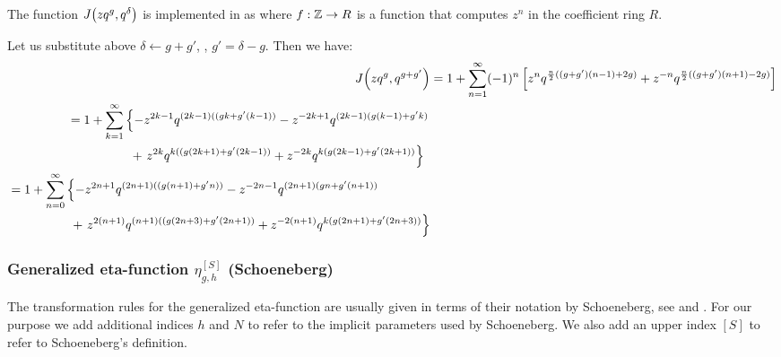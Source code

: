 \documentclass{article}
\begin{document}
The function $J\!\left(z q^g,q^\delta\right)$ is implemented in
 as  where
$f: \mathbb{Z} \to R$ is a function that computes $z^n$ in the coefficient
ring $R$.

Let us substitute above $\delta \gets g + g'$, \ie, $g'=\delta-g$.
Then we have:
\begin{align}
  J\!\left(zq^g,q^{g+g'}\right)
   &=
    1 + \sum_{n=1}^\infty (-1)^n \left[
    z^n q^{\frac{n}{2}((g+g') (n-1) + 2 g)}
    +
    z^{-n} q^{\frac{n}{2}((g+g') (n+1) - 2 g)}
    \right]
  \notag\\
  \begin{split}
  &=
    1 + \sum_{k=1}^\infty
    \left\{
    -
    z^{2k-1}
    q^{(2k-1)((g k + g' (k-1))}
    -
    z^{-2k+1}
    q^{(2k-1)(g (k-1) + g' k)}
    \right.
  \notag\\
  &\qquad\qquad\quad
    +
    \left.
    z^{2k}
    q^{k ((g (2k+1) + g' (2k-1))}
    +
    z^{-2k}
    q^{k (g (2k-1) +g' (2k+1))}
  \right\}
  \end{split}
  \notag\\
  \begin{split}
  &=
    1 + \sum_{n=0}^\infty
    \left\{
    -
    z^{2 n + 1}
    q^{(2 n + 1) ((g (n+1) + g' n))}
    -
    z^{-2n-1}
    q^{(2 n + 1) (g n + g' (n+1))}
    \right.
  \\
  &\qquad\qquad\quad
    +
    \left.
    z^{2(n+1)}
    q^{(n+1) ((g (2 n + 3) + g' (2 n + 1))}
    +
    z^{-2 (n + 1)}
    q^{k (g (2 n + 1) + g' (2 n + 3))}
  \right\}
  \end{split}
  \label{eq:Jacobi-g-g'}
\end{align}











\subsubsection{Generalized eta-function $\eta_{g,h}^{[S]}$ (Schoeneberg)}

\begin{Hemmecke}
  The transformation rules for the generalized eta-function are
  usually given in terms of their notation by Schoeneberg, see
  \cite[Chp.~VIII]{Schoeneberg_EllipticModularFunctions_1974} and
  \cite{ChenDuZhao_FindingModularFunctionsRamanujan_2019}. For our
  purpose we add additional indices $h$ and $N$ to refer to the
  implicit parameters used by Schoeneberg. We also add an upper index
  $[S]$ to refer to Schoeneberg's definition.
\end{Hemmecke}
\end{document}
